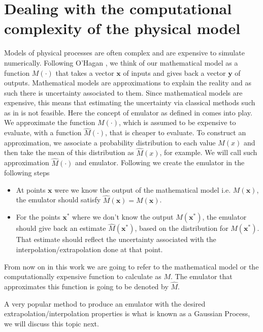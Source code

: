 \documentclass[12pt]{book}
\begin{document}
\section{Dealing with  the computational complexity of the physical model}
Models of physical processes are often complex and are  expensive to simulate numerically.
Following O'Hagan  \cite{o2006bayesian}, we think of our  mathematical model as a function
$M(\cdot)$ that takes a vector $\textbf{x}$ of inputs and gives back a vector $\textbf{y}$ of outputs.  
Mathematical models are approximations to explain the reality and as such there is uncertainty associated
to them. Since mathematical models are expensive,
this means that estimating the uncertainty via   classical methods such  as in 
\cite{saltelli2000sensitivity} is not feasible. Here the concept of emulator as defined in \cite{o2006bayesian} 
comes into play. We 
approximate the function $M(\cdot)$, which is assumed to be expensive to evaluate,
 with a function $\hat{M}(\cdot)$, that is cheaper to evaluate. To construct an approximation,   
we  associate a 
probability distribution to each value $M(x)$ and then take the mean
of this distribution as $\hat{M}(x)$, for example. We will call such approximation $\hat{M}(\cdot)$ and emulator. 
Following \cite{o2006bayesian} we create the emulator in the following steps 
\begin{itemize}
\item At points $\textbf{x}$  were we know the output of the mathematical model i.e. $M(\textbf{x})$,
the emulator should satisfy $\hat{M}(\textbf{x})=M(\textbf{x})$.
\item For the points $\textbf{x}^{*}$ where we don't know the output $M(\textbf{x}^{*})$, the emulator should
give back an estimate $\hat{M}(\textbf{x}^{*})$, based on the distribution for $M(\textbf{x}^{*})$. 
That estimate should reflect the uncertainty associated with
the interpolation/extrapolation done at that point.
\end{itemize} 

From now on in this work we are going to refer to the mathematical model or the computationally expensive
function to calculate as $M$. The emulator that approximates this function is going to be denoted by $\hat{M}$.

A very popular  method to produce an emulator with the desired
extrapolation/interpolation properties is what is known as a Gaussian Process, we will discuss this topic next.  
\end{document}
